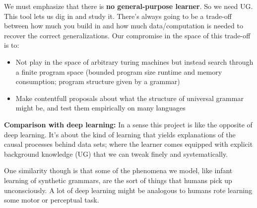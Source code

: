 \documentclass{article}
\begin{document}
We must emphasize that there is \textbf{no general-purpose
  learner}. So we need UG. This tool lets us dig in and study it.
There's always going to be a trade-off between how much you build in and how much data/computation is needed to recover the correct generalizations. Our compromise in the space of this trade-off is to:
\begin{itemize}
\item  Not play in the space of arbitrary turing machines but instead search through a finite program space (bounded program size runtime and memory consumption; program structure given by a grammar)
  \item Make contentfull proposals about what the structure of
    universal grammar might be, and test them empirically on many
    languages
\end{itemize}

\textbf{Comparison with deep learning:} In a sense this project is like
the opposite of deep learning. It's about the kind of learning that
yields explanations of the causal processes behind data sets; where
the learner comes equipped with explicit background knowledge (UG)
that we can tweak finely and systematically.

One similarity though is that some of the phenomena we model, like
infant learning of synthetic grammars, are the sort of things that
humans pick up unconsciously. A lot of deep learning might be
analogous to humans rote learning some motor or perceptual task.


%
 
\end{document}
